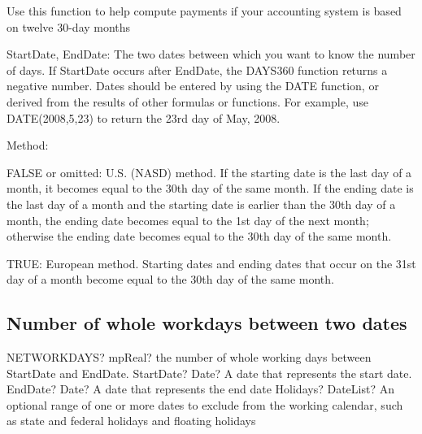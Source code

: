 %

\vspace{0.3cm}
Use this function to help compute payments if your accounting system is based on twelve 30-day months

StartDate, EndDate: The two dates between which you want to know the number of days. If StartDate occurs after EndDate, the DAYS360 function returns a negative number. Dates should be entered by using the DATE function, or derived from the results of other formulas or functions. For example, use DATE(2008,5,23) to return the 23rd day of May, 2008. 

\vspace{0.3cm}
Method: 

FALSE or omitted:  U.S. (NASD) method. If the starting date is the last day of a month, it becomes equal to the 30th day of the same month. If the ending date is the last day of a month and the starting date is earlier than the 30th day of a month, the ending date becomes equal to the 1st day of the next month; otherwise the ending date becomes equal to the 30th day of the same month. 

TRUE: European method. Starting dates and ending dates that occur on the 31st day of a month become equal to the 30th day of the same month. 





\subsection{Number of whole workdays between two dates}

\begin{mpFunctionsExtract}
	\mpWorksheetFunctionThreeNotImplemented
	{NETWORKDAYS? mpReal? the number of whole working days between StartDate and EndDate.}
	{StartDate? Date? A date that represents the start date.}
	{EndDate? Date? A date that represents the end date}
	{Holidays? DateList?  An optional range of one or more dates to exclude from the working calendar, such as state and federal holidays and floating holidays}
\end{mpFunctionsExtract}

